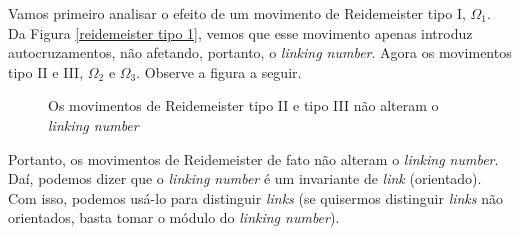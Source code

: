 	\par\vspace{0.3cm} Vamos primeiro analisar o efeito de um movimento de Reidemeister tipo I, $\Omega_1$. 
	Da Figura \eqref{reidemeister tipo 1}, vemos que esse movimento apenas introduz autocruzamentos, não 
	afetando, portanto, o \textit{linking number}. Agora os movimentos tipo II e III, $\Omega_2$ e $\Omega_3$.
	Observe a figura a seguir.
	\begin{figure}[H]
        \centering
        \hfill
        \caption{Os movimentos de Reidemeister tipo II e tipo III não alteram o \textit{linking number}}
    \end{figure}
	\par\vspace{0.3cm} Portanto, os movimentos de Reidemeister de fato não alteram o \textit{linking number}. 
	Daí, podemos dizer que o \textit{linking number} é um invariante de \textit{link} (orientado). Com isso,
	podemos usá-lo para distinguir \textit{links} (se quisermos distinguir \textit{links} não orientados, 
	basta tomar o módulo do \textit{linking number}).
	
